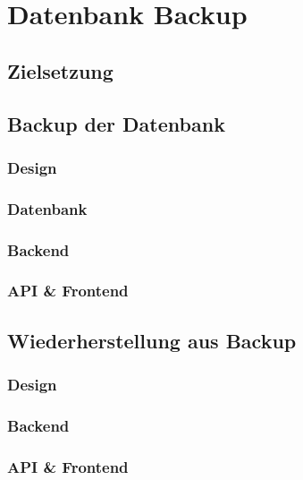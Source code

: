 \chapter{Datenbank Backup}
\label{chp:Datenback-Backup}
\section{Zielsetzung}

\section{Backup der Datenbank}
\subsection{Design}
\subsection{Datenbank}
\subsection{Backend}
\subsection{API \& Frontend}

\section{Wiederherstellung aus Backup}
\subsection{Design}
\subsection{Backend}
\subsection{API \& Frontend}